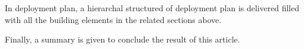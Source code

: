 In deployment plan, a hierarchal structured of deployment plan is delivered filled with all the building elements in the related sections above.

Finally, a summary is given to conclude the result of this article.




